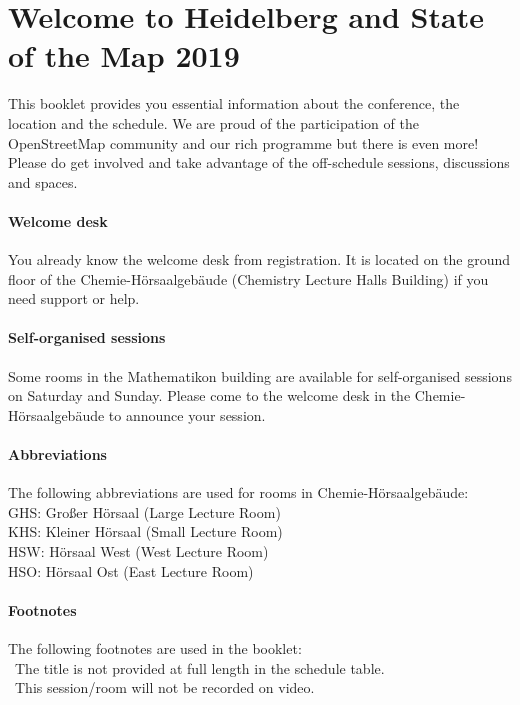 \newpage
\enlargethispage{1\baselineskip}
\section*{Welcome to Heidelberg and State of the Map 2019} \label{welcome}
This booklet provides you essential information
about the conference, the location and the schedule.  We are proud of the participation of the
OpenStreetMap community and our rich programme but there is even more!  Please do get involved and
take advantage of the off-schedule sessions, discussions and spaces.

\paragraph*{Welcome desk} \label{welcome-helpdesk}
You already know the welcome desk from registration. It is located on the ground floor of the Chemie-Hörsaalgebäude (Chemistry
Lecture Halls Building) if you need support or help.

\paragraph*{Self-organised sessions} \label{welcome-location}
Some rooms in the Mathematikon building are available for self-organised sessions on Saturday and
Sunday. Please come to the welcome desk in the Chemie-Hörsaalgebäude to announce your session.

\paragraph*{Abbreviations}
The following abbreviations are used for rooms in Chemie-Hörsaalgebäude:\\
GHS: Großer Hörsaal (Large Lecture Room)\\
KHS: Kleiner Hörsaal (Small Lecture Room)\\
HSW: Hörsaal West (West Lecture Room)\\
HSO: Hörsaal Ost (East Lecture Room)

\paragraph*{Footnotes}
The following footnotes are used in the booklet:\\
\diamondSymbol\ The title is not provided at full length in the schedule table.\\
\noVideo\ This session/room will not be recorded on video.

\newpage
